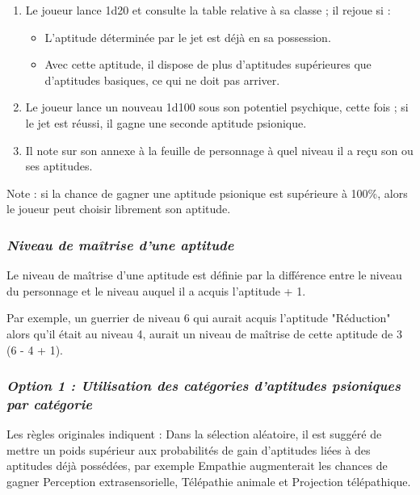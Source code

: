 \documentclass[11pt]{article}
\begin{document}
{\begin{enumerate}
\item Le joueur lance 1d20 et consulte la table relative à sa classe ; il rejoue si :
\begin{itemize}
\item L'aptitude déterminée par le jet est déjà en sa possession.
\item Avec cette aptitude, il dispose de plus d'aptitudes supérieures que d'aptitudes basiques, ce qui ne doit pas arriver.
\end{itemize}
\item Le joueur lance un nouveau 1d100 sous son potentiel psychique, cette fois ; si le jet est réussi, il gagne une seconde aptitude psionique.
\item Il note sur son annexe à la feuille de personnage à quel niveau il a reçu son ou ses aptitudes. \end{enumerate}

\bigskip

Note : si la chance de gagner une aptitude psionique est supérieure à 100\%, alors le joueur peut choisir librement son aptitude.

\subsubsection*{\textit{Niveau de maîtrise d'une aptitude}}

Le niveau de maîtrise d'une aptitude est définie par la différence entre le niveau du personnage et le niveau auquel il a acquis l'aptitude + 1.

\bigskip

Par exemple, un guerrier de niveau  6 qui aurait acquis l'aptitude "Réduction" alors qu'il était au niveau 4, aurait un niveau de maîtrise de cette aptitude de 3 (6 - 4 + 1).


\subsubsection*{\textit{Option 1 : Utilisation des catégories d'aptitudes psioniques par catégorie}}

Les règles originales indiquent : \og Dans la sélection aléatoire, il est suggéré de mettre un poids supérieur aux probabilités de gain d’aptitudes liées à des aptitudes déjà possédées, par exemple Empathie augmenterait les chances de gagner Perception extrasensorielle, Télépathie animale et Projection télépathique\fg{}.

}
\end{document}
